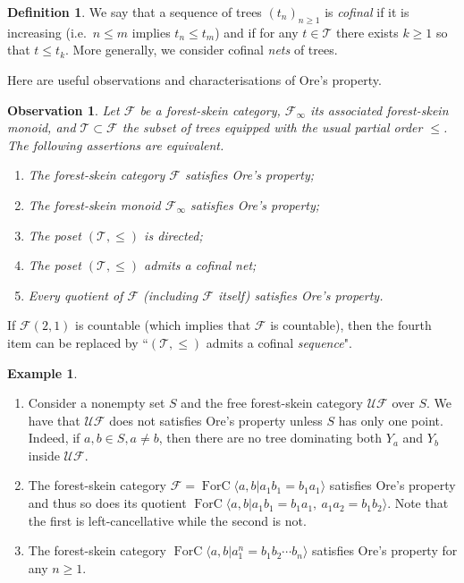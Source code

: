 \documentclass[a4paper, 12pt]{amsart}
\numberwithin{equation}{section}
\newtheorem{observation}[theorem]{Observation}
\theoremstyle{definition}
\newtheorem{definition}[theorem]{Definition}
\newtheorem{example}[theorem]{Example}
\newcommand{\cF}{\mathcal F}
\DeclareMathOperator{\FC}{ForC}
\newcommand{\la}{\langle}
\newcommand{\ra}{\rangle}
\newcommand{\cT}{\mathcal T}
\newcommand{\cUF}{\mathcal{UF}}
\begin{document}
\begin{definition}
We say that a sequence of trees $(t_n)_{n\geq 1}$ is \textit{cofinal} if it is increasing (i.e.~$n\leq m$ implies $t_n\leq t_m$) and if for any $t\in\cT$ there exists $k\geq 1$ so that $t\leq t_k$. 
More generally, we consider cofinal {\it nets} of trees.
\end{definition}

Here are useful observations and characterisations of Ore's property. 

\begin{observation}\label{obs:Ore}
Let $\cF$ be a forest-skein category, $\cF_\infty$ its associated forest-skein monoid, and $\cT\subset\cF$ the subset of trees equipped with the usual partial order $\leq$.
The following assertions are equivalent.
\begin{enumerate}
\item The forest-skein category $\cF$ satisfies Ore's property;
\item The forest-skein monoid $\cF_\infty$ satisfies Ore's property;
\item The poset $(\cT,\leq)$ is directed;
\item The poset $(\cT,\leq)$ admits a cofinal net;
\item Every quotient of $\cF$ (including $\cF$ itself) satisfies Ore's property.
\end{enumerate}
\end{observation}
If $\cF(2,1)$ is countable (which implies that $\cF$ is countable), then the fourth item can be replaced by ``$(\cT,\leq)$ admits a cofinal {\it sequence}".

\begin{example}
\begin{enumerate}
\item Consider a nonempty set $S$ and the free forest-skein category $\cUF$ over $S$.
We have that $\cUF$ does not satisfies Ore's property unless $S$ has only one point.
Indeed, if $a,b\in S, a\neq b$, then there are no tree dominating both $Y_a$ and $Y_b$ inside $\cUF$.
\item The forest-skein category $\cF=\FC\la a,b| a_1b_1=b_1a_1\ra$ satisfies Ore's property and thus so does its quotient $\FC\la a,b| a_1b_1=b_1a_1 , \ a_1a_2=b_1b_2\ra$.
Note that the first is left-cancellative while the second is not.
\item The forest-skein category $\FC\la a,b| a_1^n=b_1b_2\cdots b_n\ra$ satisfies Ore's property for any $n\geq 1$.
\end{enumerate}
\end{example}
\end{document}
